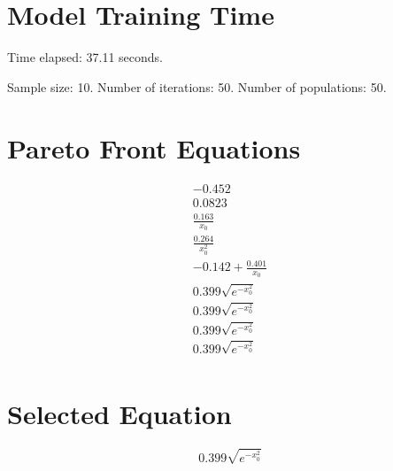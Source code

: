 \documentclass{article}
\begin{document}
\section*{Model Training Time}
Time elapsed: 37.11 seconds.

Sample size: 10.
Number of iterations: 50.
Number of populations: 50.

\section*{Pareto Front Equations}
\begin{align*}
-0.452 \\
0.0823 \\
\frac{0.163}{x_{0}} \\
\frac{0.264}{x_{0}^{2}} \\
-0.142 + \frac{0.401}{x_{0}} \\
0.399 \sqrt{e^{- x_{0}^{2}}} \\
0.399 \sqrt{e^{- x_{0}^{2}}} \\
0.399 \sqrt{e^{- x_{0}^{2}}} \\
0.399 \sqrt{e^{- x_{0}^{2}}} \\
\end{align*}

\section*{Selected Equation}
\[ 0.399 \sqrt{e^{- x_{0}^{2}}} \]
\end{document}
